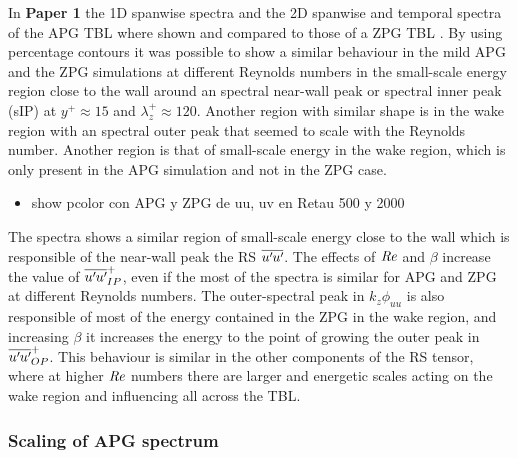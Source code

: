 In \textbf{Paper 1} the 1D spanwise spectra and the 2D spanwise and temporal spectra of the APG TBL where shown and compared to those of a ZPG TBL \citep{EAmorZPG}. By using percentage contours it was possible to show a similar behaviour in the mild APG and the ZPG simulations at different Reynolds numbers in the small-scale energy region close to the wall around an spectral near-wall peak or spectral inner peak (sIP) at $y^+\approx 15$ and $\lambda_z^+\approx 120$. Another region with similar shape is in the wake region with an spectral outer peak that seemed to scale with the Reynolds number.
Another region is that of small-scale energy in the wake region, which is only present in the APG simulation and not in the ZPG case.

\begin{itemize}
    \item show pcolor con APG y ZPG de uu, uv en Retau 500 y 2000
\end{itemize}

The spectra shows a similar region of small-scale energy close to the wall which is responsible of the near-wall peak the RS $\overline{u^{\prime}\mkern-1.2mu u^{\prime}\mkern-1.2mu}$. The effects of $\mbox{\textit{Re}}$ and $\beta$ increase the value of $\overline{u^{\prime}\mkern-1.2mu u^{\prime}\mkern-1.2mu}_{IP}^+$, even if the most of the spectra is similar for APG and ZPG at different Reynolds numbers.
The outer-spectral peak in $k_z\phi_{uu}$ is also responsible of most of the energy contained in the ZPG in the wake region, and increasing $\beta$ it increases the energy to the point of growing the outer peak in $\overline{u^{\prime}\mkern-1.2mu u^{\prime}\mkern-1.2mu}_{OP}^+$. This behaviour is similar in the other components of the RS tensor, where at higher $\mbox{\textit{Re}}$ numbers there are larger and energetic scales acting on the wake region and influencing all across the TBL.

\subsubsection{Scaling of APG spectrum}

